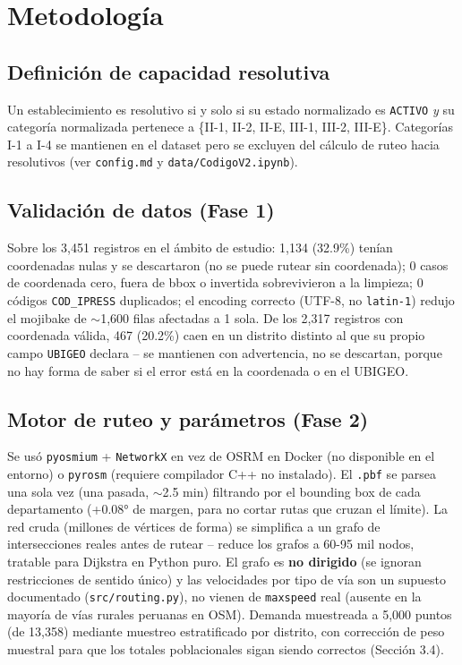 \documentclass[11pt,a4paper]{article}
\begin{document}
\section{Metodología}
\subsection{Definición de capacidad resolutiva}
Un establecimiento es resolutivo si y solo si su estado normalizado es
\texttt{ACTIVO} \emph{y} su categoría normalizada pertenece a
\{II-1, II-2, II-E, III-1, III-2, III-E\}. Categorías I-1 a I-4 se
mantienen en el dataset pero se excluyen del cálculo de ruteo hacia
resolutivos (ver \texttt{config.md} y \texttt{data/CodigoV2.ipynb}).

\subsection{Validación de datos (Fase 1)}
Sobre los 3,451 registros en el ámbito de estudio: 1,134 (32.9\%) tenían
coordenadas nulas y se descartaron (no se puede rutear sin coordenada); 0
casos de coordenada cero, fuera de bbox o invertida sobrevivieron a la
limpieza; 0 códigos \texttt{COD\_IPRESS} duplicados; el encoding correcto
(UTF-8, no \texttt{latin-1}) redujo el mojibake de $\sim$1,600 filas
afectadas a 1 sola. De los 2,317 registros con coordenada válida, 467
(20.2\%) caen en un distrito distinto al que su propio campo
\texttt{UBIGEO} declara -- se mantienen con advertencia, no se descartan,
porque no hay forma de saber si el error está en la coordenada o en el
UBIGEO.

\subsection{Motor de ruteo y parámetros (Fase 2)}
Se usó \texttt{pyosmium} + \texttt{NetworkX} en vez de OSRM en Docker (no
disponible en el entorno) o \texttt{pyrosm} (requiere compilador C++ no
instalado). El \texttt{.pbf} se parsea una sola vez (una pasada,
$\sim$2.5 min) filtrando por el bounding box de cada departamento (+0.08°
de margen, para no cortar rutas que cruzan el límite). La red cruda
(millones de vértices de forma) se simplifica a un grafo de intersecciones
reales antes de rutear -- reduce los grafos a 60-95 mil nodos, tratable
para Dijkstra en Python puro. El grafo es \textbf{no dirigido} (se ignoran
restricciones de sentido único) y las velocidades por tipo de vía son un
supuesto documentado (\texttt{src/routing.py}), no vienen de
\texttt{maxspeed} real (ausente en la mayoría de vías rurales peruanas en
OSM). Demanda muestreada a 5,000 puntos (de 13,358) mediante muestreo
estratificado por distrito, con corrección de peso muestral para que los
totales poblacionales sigan siendo correctos (Sección 3.4).
\end{document}
